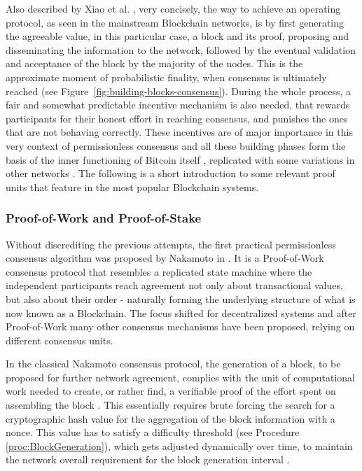 Also described by Xiao et al. \cite{survey-dist-consensus}, very concisely, the way to achieve an operating protocol, as seen in the mainstream Blockchain networks, is by first generating the agreeable value, in this particular case, a block and its proof, proposing and disseminating the information to the network, followed by the eventual validation and acceptance of the block by the majority of the nodes. This is the approximate moment of probabilistic finality, when consensus is ultimately reached (see Figure~\ref{fig:building-blocks-consensus}). During the whole process, a fair and somewhat predictable incentive mechanism is also needed, that rewards participants for their honest effort in reaching consensus, and punishes the ones that are not behaving correctly. These incentives are of major importance in this very context of permissionless consensus and all these building phases form the basis of the inner functioning of Bitcoin itself \cite{nakamoto2008bitcoin}, replicated with some variations in other networks \cite{buterin2014next, survey-dist-consensus}. The following is a short introduction to some relevant proof units that feature in the most popular Blockchain systems.

\subsubsection{Proof-of-Work and Proof-of-Stake}

Without discrediting the previous attempts, the first practical permissionless consensus algorithm was proposed by Nakamoto in \cite{nakamoto2008bitcoin}. It is a Proof-of-Work consensus protocol that resembles a replicated state machine where the independent participants reach agreement not only about transactional values, but also about their order - naturally forming the underlying structure of what is now known as a Blockchain. The focus shifted for decentralized systems and after Proof-of-Work many other consensus mechanisms have been proposed, relying on different consensus units.

In the classical Nakamoto consensus protocol, the generation of a block, to be proposed for further network agreement, complies with the unit of computational work needed to create, or rather find, a verifiable proof of the effort spent on assembling the block \cite{nakamoto2008bitcoin}. This essentially requires brute forcing the search for a cryptographic hash value for the aggregation of the block information with a nonce. This value has to satisfy a difficulty threshold (see Procedure \ref{proc:BlockGeneration}), which gets adjusted dynamically over time, to maintain the network overall requirement for the block generation interval \cite{8629877, survey-dist-consensus}.

